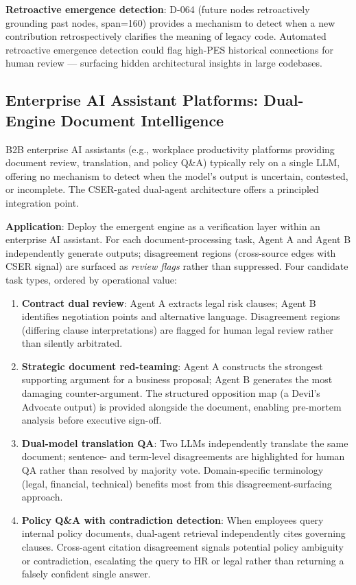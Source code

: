 \documentclass[12pt]{article}
\begin{document}
\textbf{Retroactive emergence detection}: D-064 (future nodes retroactively grounding past nodes, span=160) provides a mechanism to detect when a new contribution retrospectively clarifies the meaning of legacy code. Automated retroactive emergence detection could flag high-PES historical connections for human review --- surfacing hidden architectural insights in large codebases.

\subsection{Enterprise AI Assistant Platforms: Dual-Engine Document Intelligence}

B2B enterprise AI assistants (e.g., workplace productivity platforms providing document
review, translation, and policy Q\&A) typically rely on a single LLM, offering no
mechanism to detect when the model's output is uncertain, contested, or incomplete.
The CSER-gated dual-agent architecture offers a principled integration point.

\textbf{Application}: Deploy the emergent engine as a verification layer within an
enterprise AI assistant. For each document-processing task, Agent A and Agent B
independently generate outputs; disagreement regions (cross-source edges with
CSER signal) are surfaced as \emph{review flags} rather than suppressed.
Four candidate task types, ordered by operational value:

\begin{enumerate}
  \item \textbf{Contract dual review}: Agent A extracts legal risk clauses; Agent B
        identifies negotiation points and alternative language. Disagreement regions
        (differing clause interpretations) are flagged for human legal review rather
        than silently arbitrated.
  \item \textbf{Strategic document red-teaming}: Agent A constructs the strongest
        supporting argument for a business proposal; Agent B generates the most
        damaging counter-argument. The structured opposition map (a Devil's Advocate
        output) is provided alongside the document, enabling pre-mortem analysis
        before executive sign-off.
  \item \textbf{Dual-model translation QA}: Two LLMs independently translate the
        same document; sentence- and term-level disagreements are highlighted for
        human QA rather than resolved by majority vote. Domain-specific terminology
        (legal, financial, technical) benefits most from this disagreement-surfacing
        approach.
  \item \textbf{Policy Q\&A with contradiction detection}: When employees query
        internal policy documents, dual-agent retrieval independently cites governing
        clauses. Cross-agent citation disagreement signals potential policy ambiguity
        or contradiction, escalating the query to HR or legal rather than returning
        a falsely confident single answer.
\end{enumerate}
\end{document}
